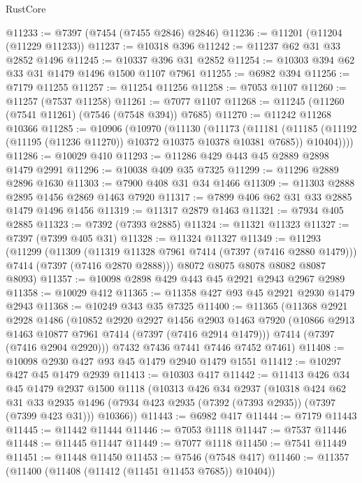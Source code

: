 \begin{lexlean}{RustCore}
\begin{coremodule}
@11233 := @7397 (@7454 (@7455 @2846) @2846)
@11236 := @11201 (@11204 (@11229 @11233))
@11237 := @10318 @396
@11242 := @11237 @62 @31 @33 @2852 @1496
@11245 := @10337 @396 @31 @2852
@11254 := @10303 @394 @62 @33 @31 @1479 @1496 @1500 @1107 @7961
@11255 := @6982 @394
@11256 := @7179 @11255
@11257 := @11254 @11256
@11258 := @7053 @1107
@11260 := @11257 (@7537 @11258)
@11261 := @7077 @1107
@11268 := @11245 (@11260 (@7541 @11261) (@7546 (@7548 @394)) @7685)
@11270 := @11242 @11268 @10366
@11285 := @10906
    (@10970
      (@11130
        (@11173
          (@11181
            (@11185 (@11192 (@11195 (@11236 @11270)) @10372 @10375 @10378 @10381 @7685))
            @10404))))
@11286 := @10029 @410
@11293 := @11286 @429 @443 @45 @2889 @2898 @1479 @2991
@11296 := @10038 @409 @35 @7325
@11299 := @11296 @2889 @2896 @1630
@11303 := @7900 @408 @31 @34 @1466
@11309 := @11303 @2888 @2895 @1456 @2869 @1463 @7920
@11317 := @7899 @406 @62 @31 @33 @2885 @1479 @1496 @1456
@11319 := @11317 @2879 @1463
@11321 := @7934 @405 @2885
@11323 := @7392 (@7393 @2885)
@11324 := @11321 @11323
@11327 := @7397 (@7399 @405 @31)
@11328 := @11324 @11327
@11349 := @11293
    (@11299
      (@11309
        (@11319 @11328 @7961 @7414 (@7397 (@7416 @2880 @1479)))
        @7414
        (@7397 (@7416 @2870 @2888)))
      @8072
      @8075
      @8078
      @8082
      @8087
      @8093)
@11357 := @10098 @2898 @429 @443 @45 @2921 @2943 @2967 @2989
@11358 := @10029 @412
@11365 := @11358 @427 @93 @45 @2921 @2930 @1479 @2943
@11368 := @10249 @343 @35 @7325
@11400 := @11365
    (@11368
      @2921
      @2928
      @1486
      (@10852
        @2920
        @2927
        @1456
        @2903
        @1463
        @7920
        (@10866 @2913 @1463 @10877 @7961 @7414 (@7397 (@7416 @2914 @1479)))
        @7414
        (@7397 (@7416 @2904 @2920)))
      @7432
      @7436
      @7441
      @7446
      @7452
      @7461)
@11408 := @10098 @2930 @427 @93 @45 @1479 @2940 @1479 @1551
@11412 := @10297 @427 @45 @1479 @2939
@11413 := @10303 @417
@11442 := @11413
    @426
    @34
    @45
    @1479
    @2937
    @1500
    @1118
    (@10313
      @426
      @34
      @2937
      (@10318
        @424
        @62
        @31
        @33
        @2935
        @1496
        (@7934 @423 @2935 (@7392 (@7393 @2935)) (@7397 (@7399 @423 @31)))
        @10366))
@11443 := @6982 @417
@11444 := @7179 @11443
@11445 := @11442 @11444
@11446 := @7053 @1118
@11447 := @7537 @11446
@11448 := @11445 @11447
@11449 := @7077 @1118
@11450 := @7541 @11449
@11451 := @11448 @11450
@11453 := @7546 (@7548 @417)
@11460 := @11357 (@11400 (@11408 (@11412 (@11451 @11453 @7685)) @10404))

\end{coremodule}
\end{lexlean}
